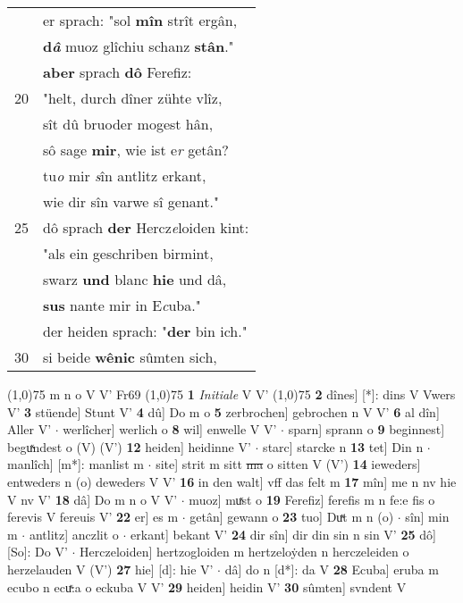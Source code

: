\documentclass[8pt,a4paper,notitlepage]{article}
\begin{document}
\begin{table}[ht]
\begin{minipage}[t]{0.5\linewidth}
\begin{tabular}{rl}
 & er sprach: "sol \textbf{mîn} strît ergân,\\ 
 & \textbf{d\textit{â}} muoz glîchiu schanz \textbf{stân}."\\ 
 & \textbf{aber} sprach \textbf{dô} Ferefiz:\\ 
20 & "helt, durch dîner zühte vlîz,\\ 
 & sît dû bruoder mogest hân,\\ 
 & sô sage \textbf{mir}, wie ist e\textit{r} getân?\\ 
 & tu\textit{o} mir \textit{s}în antlitz erkant,\\ 
 & wie dir sîn varwe sî genant."\\ 
25 & dô sprach \textbf{der} Hercz\textit{e}loiden kint:\\ 
 & "als ein geschriben birmint,\\ 
 & swarz \textbf{und} blanc \textbf{hie} und dâ,\\ 
 & \textbf{sus} nante mir in E\textit{c}uba."\\ 
 & der heiden sprach: "\textbf{der} bin ich."\\ 
30 & si beide \textbf{wênic} sûmten sich,\\ 
\end{tabular}
\scriptsize
\line(1,0){75} \newline
m n o V V' Fr69 \newline
\line(1,0){75} \newline
\textbf{1} \textit{Initiale} V V'  \newline
\line(1,0){75} \newline
\textbf{2} dînes] [*]: dins V Vwers V' \textbf{3} stüende] Stunt V' \textbf{4} dû] Do m o \textbf{5} zerbrochen] gebrochen n V V' \textbf{6} al dîn] Aller V'  $\cdot$ werlîcher] werlich o \textbf{8} wil] enwelle V V'  $\cdot$ sparn] sprann o \textbf{9} beginnest] beguͯndest o (V) (V') \textbf{12} heiden] heidinne V'  $\cdot$ starc] starcke n \textbf{13} tet] Din n  $\cdot$ manlîch] [m*]: manlist m  $\cdot$ site] strit m sitt \sout{ma} o sitten V (V') \textbf{14} ieweders] entweders n (o) deweders V V' \textbf{16} in den walt] vff das felt m \textbf{17} mîn] me n nv hie V nv V' \textbf{18} dâ] Do m n o V V'  $\cdot$ muoz] muͯst o \textbf{19} Ferefiz] ferefis m n fe:e fis o ferevis V fereuis V' \textbf{22} er] es m  $\cdot$ getân] gewann o \textbf{23} tuo] Duͯt m n (o)  $\cdot$ sîn] min m  $\cdot$ antlitz] anczlit o  $\cdot$ erkant] bekant V' \textbf{24} dir sîn] dir din sin n sin V' \textbf{25} dô] [So]: Do V'  $\cdot$ Herczeloiden] hertzogloiden m hertzeloẏden n herczeleiden o herzelauden V (V') \textbf{27} hie] [d]: hie V'  $\cdot$ dâ] do n [d*]: da V \textbf{28} Ecuba] eruba m ecubo n ecuͯ:a o eckuba V V' \textbf{29} heiden] heidin V' \textbf{30} sûmten] svndent V \newline
\end{minipage}
\end{table}
\end{document}
